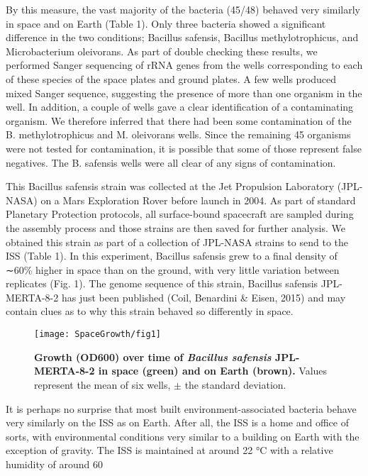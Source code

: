 By this measure, the vast majority of the bacteria (45/48) behaved very similarly in space and on Earth (Table 1). Only three bacteria showed a significant difference in the two conditions; Bacillus safensis, Bacillus methylotrophicus, and Microbacterium oleivorans. As part of double checking these results, we performed Sanger sequencing of rRNA genes from the wells corresponding to each of these species of the space plates and ground plates. A few wells produced mixed Sanger sequence, suggesting the presence of more than one organism in the well. In addition, a couple of wells gave a clear identification of a contaminating organism. We therefore inferred that there had been some contamination of the B. methylotrophicus and M. oleivorans wells. Since the remaining 45 organisms were not tested for contamination, it is possible that some of those represent false negatives. The B. safensis wells were all clear of any signs of contamination.



This Bacillus safensis strain was collected at the Jet Propulsion Laboratory (JPL-NASA) on a Mars Exploration Rover before launch in 2004. As part of standard Planetary Protection protocols, all surface-bound spacecraft are sampled during the assembly process and those strains are then saved for further analysis. We obtained this strain as part of a collection of JPL-NASA strains to send to the ISS (Table 1). In this experiment, Bacillus safensis grew to a final density of ∼60\% higher in space than on the ground, with very little variation between replicates (Fig. 1). The genome sequence of this strain, Bacillus safensis JPL-MERTA-8-2 has just been published (Coil, Benardini & Eisen, 2015) and may contain clues as to why this strain behaved so differently in space.

\begin{figure}
    \centering
    \texttt{[image: SpaceGrowth/fig1]}
    \caption{\textbf{Growth (OD600) over time of {\em Bacillus safensis} JPL-MERTA-8-2 in space (green) and on Earth (brown).} Values represent the mean of six wells, $\pm$ the standard deviation.}
    \label{SG_fig1}
\end{figure}

It is perhaps no surprise that most built environment-associated bacteria behave very similarly on the ISS as on Earth. After all, the ISS is a home and office of sorts, with environmental conditions very similar to a building on Earth with the exception of gravity. The ISS is maintained at around 22 °C with a relative humidity of around 60%

